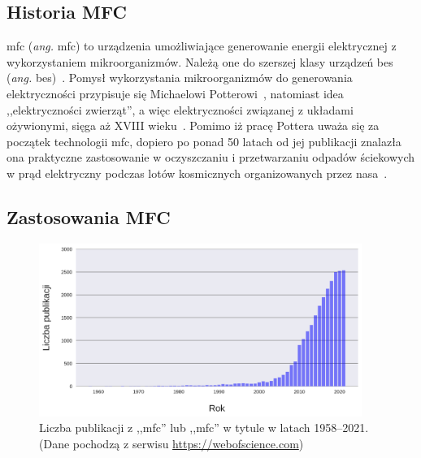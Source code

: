\subsection{Historia MFC}\label{subsec:historia}
\acrshort{mfc} (\textit{ang.} \acrlong{mfc}) to urządzenia umożliwiające
generowanie energii elektrycznej z wykorzystaniem mikroorganizmów.
Należą one do szerszej klasy urządzeń \acrshort{bes} (\textit{ang.}
\acrlong{bes})~\cite{Santoro2017}.
Pomysł wykorzystania mikroorganizmów do generowania elektryczności
przypisuje się Michaelowi Potterowi~\cite{Potter1911},
natomiast idea ,,elektryczności zwierząt'', a więc elektryczności
związanej z układami ożywionymi, sięga aż XVIII wieku~\cite{Santoro2017}.
Pomimo iż pracę Pottera uważa się za początek technologii \acrshort{mfc},
dopiero po ponad 50 latach od jej publikacji
znalazła ona praktyczne zastosowanie w oczyszczaniu i przetwarzaniu
odpadów ściekowych w prąd elektryczny podczas lotów kosmicznych
organizowanych przez \acrshort{nasa}~\cite{Slate2019}.

\subsection{Zastosowania MFC}\label{subsec:zastosowania-mfc}

\begin{figure}[!b]
    \centering
    \includegraphics[width=10.5cm]{figures/publications}
    \caption{
        Liczba publikacji z ,,\acrshort{mfc}'' lub
        ,,\acrlong{mfc}'' w tytule w latach 1958--2021.
        (Dane pochodzą z serwisu \url{https://webofscience.com})
    }
    \label{fig:1}
\end{figure}

